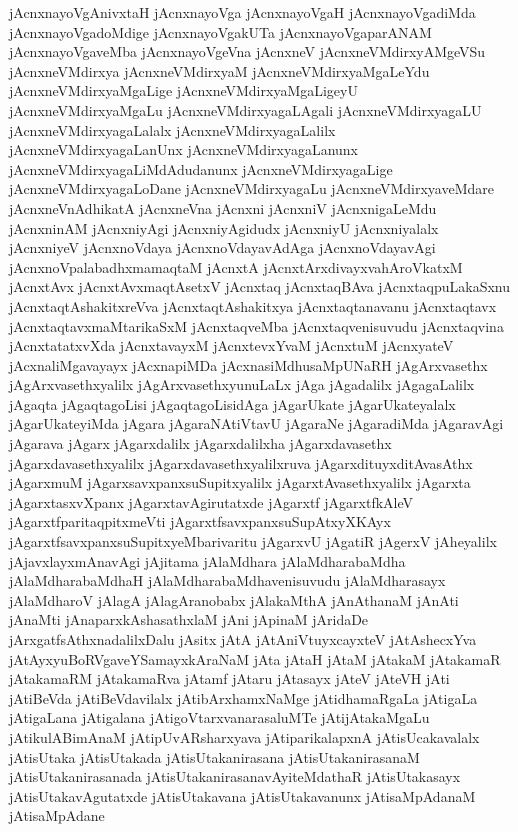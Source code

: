 {jAcnxnayoVgAnivxtaH
jAcnxnayoVga
jAcnxnayoVgaH
jAcnxnayoVgadiMda
jAcnxnayoVgadoMdige
jAcnxnayoVgakUTa
jAcnxnayoVgaparANAM
jAcnxnayoVgaveMba
jAcnxnayoVgeVna
jAcnxneV
jAcnxneVMdirxyAMgeVSu
jAcnxneVMdirxya
jAcnxneVMdirxyaM
jAcnxneVMdirxyaMgaLeYdu
jAcnxneVMdirxyaMgaLige
jAcnxneVMdirxyaMgaLigeyU
jAcnxneVMdirxyaMgaLu
jAcnxneVMdirxyagaLAgali
jAcnxneVMdirxyagaLU
jAcnxneVMdirxyagaLalalx
jAcnxneVMdirxyagaLalilx
jAcnxneVMdirxyagaLanUnx
jAcnxneVMdirxyagaLanunx
jAcnxneVMdirxyagaLiMdAdudanunx
jAcnxneVMdirxyagaLige
jAcnxneVMdirxyagaLoDane
jAcnxneVMdirxyagaLu
jAcnxneVMdirxyaveMdare
jAcnxneVnAdhikatA
jAcnxneVna
jAcnxni
jAcnxniV
jAcnxnigaLeMdu
jAcnxninAM
jAcnxniyAgi
jAcnxniyAgidudx
jAcnxniyU
jAcnxniyalalx
jAcnxniyeV
jAcnxnoVdaya
jAcnxnoVdayavAdAga
jAcnxnoVdayavAgi
jAcnxnoVpalabadhxmamaqtaM
jAcnxtA
jAcnxtArxdivayxvahAroVkatxM
jAcnxtAvx
jAcnxtAvxmaqtAsetxV
jAcnxtaq
jAcnxtaqBAva
jAcnxtaqpuLakaSxnu
jAcnxtaqtAshakitxreVva
jAcnxtaqtAshakitxya
jAcnxtaqtanavanu
jAcnxtaqtavx
jAcnxtaqtavxmaMtarikaSxM
jAcnxtaqveMba
jAcnxtaqvenisuvudu
jAcnxtaqvina
jAcnxtatatxvXda
jAcnxtavayxM
jAcnxtevxYvaM
jAcnxtuM
jAcnxyateV
jAcxnaliMgavayayx
jAcxnapiMDa
jAcxnasiMdhusaMpUNaRH
jAgArxvasethx
jAgArxvasethxyalilx
jAgArxvasethxyunuLaLx
jAga
jAgadalilx
jAgagaLalilx
jAgaqta
jAgaqtagoLisi
jAgaqtagoLisidAga
jAgarUkate
jAgarUkateyalalx
jAgarUkateyiMda
jAgara
jAgaraNAtiVtavU
jAgaraNe
jAgaradiMda
jAgaravAgi
jAgarava
jAgarx
jAgarxdalilx
jAgarxdalilxha
jAgarxdavasethx
jAgarxdavasethxyalilx
jAgarxdavasethxyalilxruva
jAgarxdituyxditAvasAthx
jAgarxmuM
jAgarxsavxpanxsuSupitxyalilx
jAgarxtAvasethxyalilx
jAgarxta
jAgarxtasxvXpanx
jAgarxtavAgirutatxde
jAgarxtf
jAgarxtfkAleV
jAgarxtfparitaqpitxmeVti
jAgarxtfsavxpanxsuSupAtxyXKAyx
jAgarxtfsavxpanxsuSupitxyeMbarivaritu
jAgarxvU
jAgatiR
jAgerxV
jAheyalilx
jAjavxlayxmAnavAgi
jAjitama
jAlaMdhara
jAlaMdharabaMdha
jAlaMdharabaMdhaH
jAlaMdharabaMdhavenisuvudu
jAlaMdharasayx
jAlaMdharoV
jAlagA
jAlagAranobabx
jAlakaMthA
jAnAthanaM
jAnAti
jAnaMti
jAnaparxkAshasathxlaM
jAni
jApinaM
jAridaDe
jArxgatfsAthxnadalilxDalu
jAsitx
jAtA
jAtAniVtuyxcayxteV
jAtAshecxYva
jAtAyxyuBoRVgaveYSamayxkAraNaM
jAta
jAtaH
jAtaM
jAtakaM
jAtakamaR
jAtakamaRM
jAtakamaRva
jAtamf
jAtaru
jAtasayx
jAteV
jAteVH
jAti
jAtiBeVda
jAtiBeVdavilalx
jAtibArxhamxNaMge
jAtidhamaRgaLa
jAtigaLa
jAtigaLana
jAtigalana
jAtigoVtarxvanarasaluMTe
jAtijAtakaMgaLu
jAtikulABimAnaM
jAtipUvARsharxyava
jAtiparikalapxnA
jAtisUcakavalalx
jAtisUtaka
jAtisUtakada
jAtisUtakanirasana
jAtisUtakanirasanaM
jAtisUtakanirasanada
jAtisUtakanirasanavAyiteMdathaR
jAtisUtakasayx
jAtisUtakavAgutatxde
jAtisUtakavana
jAtisUtakavanunx
jAtisaMpAdanaM
jAtisaMpAdane
}
